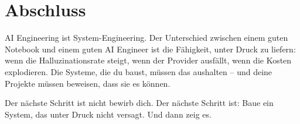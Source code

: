 \section*{Abschluss}

AI Engineering ist System-Engineering. Der Unterschied zwischen einem guten Notebook und einem guten AI Engineer ist die Fähigkeit, unter Druck zu liefern: wenn die Halluzinationsrate steigt, wenn der Provider ausfällt, wenn die Kosten explodieren. Die Systeme, die du baust, müssen das aushalten -- und deine Projekte müssen beweisen, dass sie es können.

Der nächste Schritt ist nicht \glqq bewirb dich\grqq{}. Der nächste Schritt ist: \glqq Baue ein System, das unter Druck nicht versagt. Und dann zeig es.\grqq
